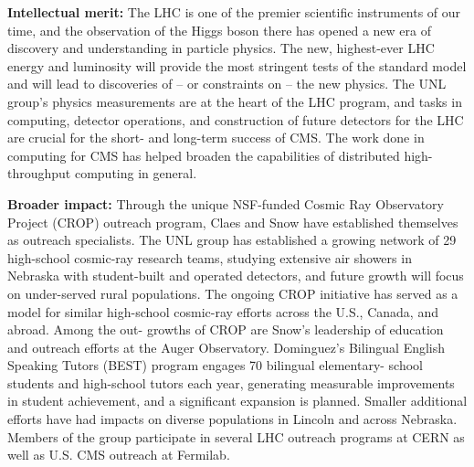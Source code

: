 \documentclass[11pt]{article}
\begin{document}
{\bf Intellectual merit:} The LHC is one of the premier scientific
instruments of our time, and the observation of the Higgs boson
there has opened a new era of discovery and understanding in
particle physics. The new, highest-ever LHC energy and luminosity
will provide the most stringent tests of the standard model and will
lead to discoveries of -- or constraints on -- the new physics.
The UNL group's physics measurements are at the heart of the LHC
program, and tasks in computing, detector operations, and
construction of future detectors for the LHC are crucial for the
short- and long-term success of CMS. The work done in computing
for CMS has helped broaden the capabilities of distributed
high-throughput computing in general.

{\bf Broader impact:}
Through the unique NSF-funded Cosmic Ray
Observatory Project (CROP) outreach program, Claes and Snow have
established themselves as outreach specialists. The UNL group has
established a growing network of 29 high-school cosmic-ray
research teams, studying extensive air showers in Nebraska with
student-built and operated detectors, and future growth will
focus on under-served rural populations. The ongoing CROP
initiative has served as a model for similar high-school
cosmic-ray efforts across the U.S., Canada, and abroad. Among the
out- growths of CROP are Snow’s leadership of education and
outreach efforts at the Auger Observatory. Dominguez’s Bilingual
English Speaking Tutors (BEST) program engages 70 bilingual
elementary- school students and high-school tutors each year,
generating measurable improvements in student achievement, and a
significant expansion is planned. Smaller additional efforts
have had impacts on diverse populations in Lincoln and across
Nebraska. Members of the group participate in several LHC outreach 
programs at CERN as well as U.S. CMS outreach at Fermilab.
\end{document}
